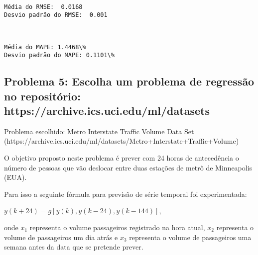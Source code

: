 \documentclass[11pt]{article}
\begin{document}
    \begin{center}
    \end{center}
    { \hspace*{\fill} \\}
    
    \begin{Verbatim}[commandchars=\\\{\}]
Média do RMSE:  0.0168
Desvio padrão do RMSE:  0.001
    \end{Verbatim}

    \begin{center}
    \end{center}
    { \hspace*{\fill} \\}
    
    \begin{Verbatim}[commandchars=\\\{\}]
Média do MAPE: 1.4468\%
Desvio padrão do MAPE: 0.1101\%
    \end{Verbatim}

    \hypertarget{problema-5-escolha-um-problema-de-regressuxe3o-no-reposituxf3rio-httpsarchive.ics.uci.edumldatasets}{%
\subsection{Problema 5: Escolha um problema de regressão no repositório:
https://archive.ics.uci.edu/ml/datasets}\label{problema-5-escolha-um-problema-de-regressuxe3o-no-reposituxf3rio-httpsarchive.ics.uci.edumldatasets}}

Problema escolhido: Metro Interstate Traffic Volume Data Set
(https://archive.ics.uci.edu/ml/datasets/Metro+Interstate+Traffic+Volume)

O objetivo proposto neste problema é prever com 24 horas de antecedência
o número de pessoas que vão deslocar entre duas estações de metrô de
Minneapolis (EUA).

Para isso a seguinte fórmula para previsão de série temporal foi
experimentada:

\(y(k+24) = g[y(k),y(k-24),y(k-144)]\),

onde \(x_{1}\) representa o volume passageiros registrado na hora atual,
\(x_{2}\) representa o volume de passageiros um dia atrás e \(x_{3}\)
representa o volume de passageiros uma semana antes da data que se
pretende prever.
\end{document}
